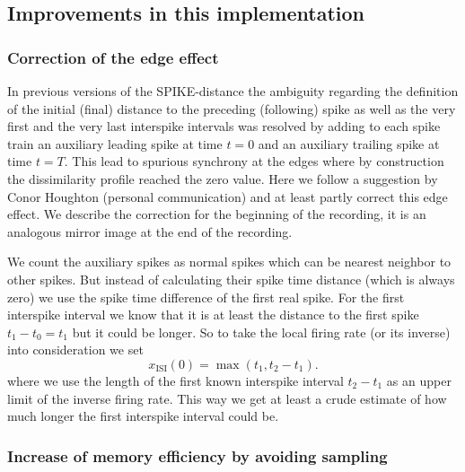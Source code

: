 \documentclass[10pt,twocolumn]{elsart5p}
\begin{document}
\subsection{\label{ss:Improvements} Improvements in this implementation}

\subsubsection{\label{sss:Edge-effect} Correction of the edge effect}

In previous versions of the SPIKE-distance the ambiguity regarding the definition of the initial (final) distance to the preceding (following) spike as well as the very first and the very last interspike intervals was resolved by adding to each spike train an auxiliary leading spike at time $t = 0$ and an auxiliary trailing spike at time $t = T$. This lead to spurious synchrony at the edges where by construction the dissimilarity profile reached the zero value. Here we follow a suggestion by Conor Houghton (personal communication) and at least partly correct this edge effect. We describe the correction for the beginning of the recording, it is an analogous mirror image at the end of the recording.

We count the auxiliary spikes as normal spikes which can be nearest neighbor to other spikes. But instead of calculating their spike time distance (which is always zero) we use the spike time difference of the first real spike. For the first interspike interval we know that it is at least the distance to the first spike $t_1-t_0 = t_1$ but it could be longer. So to take the local firing rate (or its inverse) into consideration we set
%
\begin{equation} \label{eq:Corrected-First-ISI}
    x_{\mathrm {ISI}} (0) = \max ( t_1, t_2 - t_1 ).
\end{equation}
%
where we use the length of the first known interspike interval $t_2-t_1$ as an upper limit of the inverse firing rate. This way we get at least a crude estimate of how much longer the first interspike interval could be.


\subsubsection{\label{sss:Sampling} Increase of memory efficiency by avoiding sampling}
\end{document}
